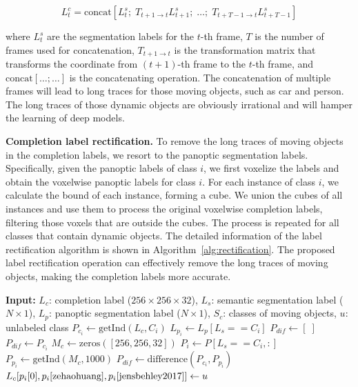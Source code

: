 \documentclass[10pt,twocolumn,letterpaper]{article}
\begin{document}
\begin{equation}
  L^c_t = \text{concat}\left[L^s_t;\; T_{t+1\to t} L^s_{t+1};\; \ldots;\; T_{t+T-1\to t} L^s_{t+T-1}\right]
  \label{eq:label_gen}
\end{equation}

where $L^s_t$ are the segmentation labels for the $t$-th frame, $T$ is the number of frames used for concatenation, $T_{t+1\to t}$ is the transformation matrix that transforms the coordinate from $(t+1)$-th frame to the $t$-th frame, and $\text{concat}[\ldots;\ldots]$ is the concatenating operation. The concatenation of multiple frames will lead to long traces for those moving objects, such as car and person. The long traces of those dynamic objects are obviously irrational and will hamper the learning of deep models.

\textbf{Completion label rectification.}
To remove the long traces of moving objects in the completion labels, we resort to the panoptic segmentation labels. Specifically, given the panoptic labels of class $i$, we first voxelize the labels and obtain the voxelwise panoptic labels for class $i$. For each instance of class $i$, we calculate the bound of each instance, forming a cube. We union the cubes of all instances and use them to process the original voxelwise completion labels, filtering those voxels that are outside the cubes. The process is repeated for all classes that contain dynamic objects. The detailed information of the label rectification algorithm is shown in Algorithm~\ref{alg:rectification}. The proposed label rectification operation can effectively remove the long traces of moving objects, making the completion labels more accurate.

\begin{algorithm}[htbp]
\caption{Pseudocode of Label Rectification.}
\label{alg:rectification}
\begin{algorithmic}\cite{zehaohuang}
\STATE \textbf{Input:} $L_c$: completion label ($256\times256\times32$), $L_s$: semantic segmentation label ($N\times1$), $L_p$: panoptic segmentation label ($N\times1$), $S_c$: classes of moving objects, $u$: unlabeled class
  \STATE $P_{c_i} \leftarrow \text{getInd}(L_c, C_i)$ 
  \STATE $L_{p_i} \leftarrow L_p[L_s == C_i]$ 
  \STATE $P_{dif} \leftarrow [\;]$
    \STATE $P_{dif} \leftarrow P_{c_i}$
    \STATE $M_c \leftarrow \text{zeros}([256, 256, 32])$
    \STATE $P_i \leftarrow P[L_s == C_i, :]$
      \STATE $P_{p_i} \leftarrow \text{getInd}(M_c, 1000)$ 
      \STATE $P_{dif} \leftarrow \text{difference}(P_{c_i}, P_{p_i})$
    \ENDFOR
  \ENDIF
      \STATE $L_c[p_i[0], p_i\cite{zehaohuang}, p_i\cite{jensbehley2017}] \leftarrow u$
    \ENDFOR
  \ENDIF
\ENDFOR
\end{algorithmic}
\end{algorithm}
\end{document}
